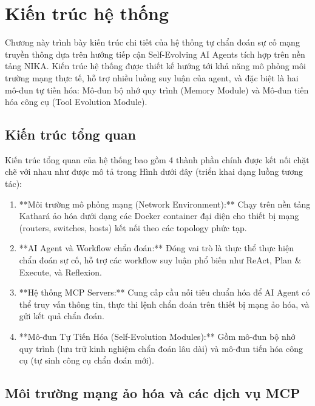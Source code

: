 \chapter{Kiến trúc hệ thống}
\label{chap:architecture}

Chương này trình bày kiến trúc chi tiết của hệ thống tự chẩn đoán sự cố mạng truyền thông dựa trên hướng tiếp cận Self-Evolving AI Agents tích hợp trên nền tảng NIKA. Kiến trúc hệ thống được thiết kế hướng tới khả năng mô phỏng môi trường mạng thực tế, hỗ trợ nhiều luồng suy luận của agent, và đặc biệt là hai mô-đun tự tiến hóa: Mô-đun bộ nhớ quy trình (Memory Module) và Mô-đun tiến hóa công cụ (Tool Evolution Module).

\section{Kiến trúc tổng quan}
\label{sec:overall_arch}

Kiến trúc tổng quan của hệ thống bao gồm 4 thành phần chính được kết nối chặt chẽ với nhau như được mô tả trong Hình dưới đây (triển khai dạng luồng tương tác):
\begin{enumerate}
    \item **Môi trường mô phỏng mạng (Network Environment):** Chạy trên nền tảng Kathará ảo hóa dưới dạng các Docker container đại diện cho thiết bị mạng (routers, switches, hosts) kết nối theo các topology phức tạp.
    \item **AI Agent và Workflow chẩn đoán:** Đóng vai trò là thực thể thực hiện chẩn đoán sự cố, hỗ trợ các workflow suy luận phổ biến như ReAct, Plan \& Execute, và Reflexion.
    \item **Hệ thống MCP Servers:** Cung cấp cầu nối tiêu chuẩn hóa để AI Agent có thể truy vấn thông tin, thực thi lệnh chẩn đoán trên thiết bị mạng ảo hóa, và gửi kết quả chẩn đoán.
    \item **Mô-đun Tự Tiến Hóa (Self-Evolution Modules):** Gồm mô-đun bộ nhớ quy trình (lưu trữ kinh nghiệm chẩn đoán lâu dài) và mô-đun tiến hóa công cụ (tự sinh công cụ chẩn đoán mới).
\end{enumerate}

\section{Môi trường mạng ảo hóa và các dịch vụ MCP}
\label{sec:net_env_mcp}

